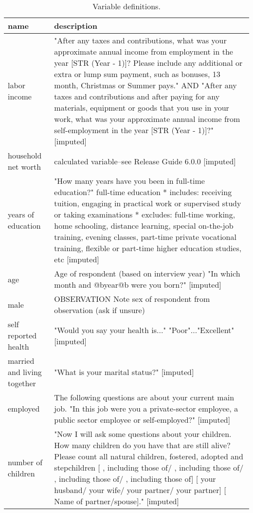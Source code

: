 \begin{table}[H]\centering\footnotesize
 \caption{\label{var_des} Variable definitions.}
\begin{tabular} {p{1.5in}p{4.5in}}   \hline
name & description   \\ \hline
  labor income & "After any taxes and contributions, what was your approximate annual income from employment in the year [STR (Year - 1)]? Please include any additional or extra or lump sum payment, such as bonuses, 13 month, Christmas or Summer pays." AND "After any taxes and contributions and after paying for any materials, equipment or goods that you use in your work, what was your approximate annual income from self-employment in the year [STR (Year - 1)]?" [imputed] \\
  household net worth & calculated variable--see Release Guide 6.0.0 [imputed] \\
  years of education & "How many years have you been in full-time education?" full-time education * includes: receiving tuition, engaging in practical work or supervised study or taking examinations * excludes: full-time working, home schooling, distance learning, special on-the-job training, evening classes, part-time private vocational training, flexible or part-time higher education studies, etc  [imputed] \\
  age & Age of respondent (based on interview year)  "In which month and @byear@b were you born?" [imputed] \\
  male & OBSERVATION Note sex of respondent from observation (ask if unsure) \\
  self reported health & "Would you say your health is..." "Poor"..."Excellent" [imputed] \\
  married and living together & "What is your marital status?"  [imputed] \\
  employed & The following questions are about your current main job. "In this job were you a private-sector employee, a public sector employee or self-employed?"  [imputed] \\
  number of children & "Now I will ask some questions about your children. How many children do you have that are still alive? Please count all natural children, fostered, adopted and stepchildren [ , including those of/ , including those of/ , including those of/ , including those of] [ your husband/ your wife/ your partner/ your partner] [ {Name of partner/spouse}]." [imputed] \\
\hline\end{tabular}\end{table}